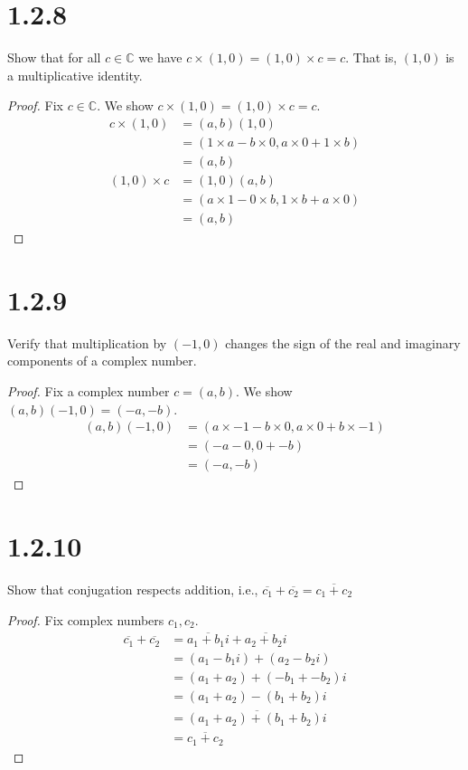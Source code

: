 \documentclass[11pt]{article}
\begin{document}

\section{1.2.8}
Show that for all $c \in \mathbb{C}$ we have $c \times (1,0) = (1,0) \times c = c$. 
That is, $(1,0)$ is a multiplicative identity.
\begin{proof} Fix $c \in \mathbb{C}$. We show $c \times (1,0) = (1,0) \times c = c$. 
\begin{align*}
	c \times (1,0) &= (a,b)(1,0) \\
	               &= (1\times a - b \times 0, a\times 0 + 1\times b) \\
		       &= (a,b)
\end{align*}
\begin{align*}
	(1,0) \times c &= (1,0)(a,b) \\ 
		       &= (a\times 1 - 0 \times b, 1\times b + a\times 0) \\
		       &= (a,b)
\end{align*}
\end{proof}


\section{1.2.9}
Verify that multiplication by $(-1,0)$ changes the sign of the real and 
imaginary components of a complex number.

\begin{proof}
Fix a complex number $c = (a,b)$. We show $(a,b)(-1,0) = (-a,-b)$.
	\begin{align*}
		(a,b)(-1,0) &= (a \times -1 - b \times 0 , a\times 0 + b \times -1 )  \\ 
		            &= (-a - 0, 0 + -b) \\
			    &= (-a,-b) 
	\end{align*}
\end{proof}


\section{1.2.10}
Show that conjugation respects addition, i.e.,
$\overline{c_1} + \overline{c_2} = \overline{c_1 + c_2}$

\begin{proof}
	Fix complex numbers $c_1, c_2$. 
	\begin{align*}
		\overline{c_1} + \overline{c_2} &= \overline{a_1 + b_1i} + \overline{a_2 + b_2i}  \\ 
						&= (a_1 - b_1i) + (a_2 - b_2i) \\
						&= (a_1 + a_2) + (-b_1 + -b_2)i \\
						&= (a_1 + a_2) - (b_1 + b_2)i \\
						&= \overline{(a_1+a_2) + (b_1+b_2)i} \\
						&= \overline{c_1 + c_2}
	\end{align*}
\end{proof}
\end{document}
